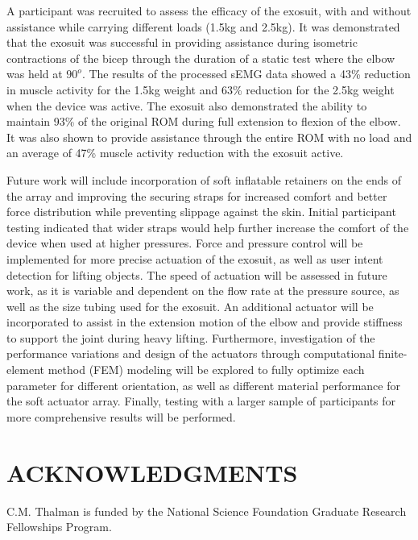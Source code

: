 \documentclass[letterpaper, 10 pt, conference]{ieeeconf}  %
\begin{document}
A participant was recruited to assess the efficacy of the exosuit, with and without assistance while carrying different loads (1.5kg and 2.5kg). It was demonstrated that the exosuit was successful in providing assistance during isometric contractions of the bicep through the duration of a static test where the elbow was held at $90^o$. The results of the processed sEMG data showed a 43\% reduction in muscle activity for the 1.5kg weight and 63\% reduction for the 2.5kg weight when the device was active. The exosuit also demonstrated  the ability to maintain 93\% of the original ROM during full extension to flexion of the elbow.  It was also shown to provide assistance through the entire ROM with no load and an average of 47\% muscle activity reduction with the exosuit active. 

Future work will include incorporation of soft inflatable retainers on the ends of the array and improving the securing straps for increased comfort and better force distribution while preventing slippage against the skin.  Initial participant testing indicated that wider straps would help further increase the comfort of the device when used at higher pressures. Force and pressure control will be implemented for more precise actuation of the exosuit, as well as user intent detection for lifting objects.  The speed of actuation will be assessed in future work, as it is variable and dependent on the flow rate at the pressure source, as well as the size tubing used for the exosuit. An additional actuator will be incorporated to assist in the extension motion of the elbow and provide stiffness to support the joint during heavy lifting. Furthermore, investigation of the performance variations and design of the actuators through computational finite-element method (FEM) modeling will be explored to fully optimize each parameter for different orientation, as well as different material performance for the soft actuator array.  Finally, testing with a larger sample of participants for more comprehensive results will be performed.  



\section*{ACKNOWLEDGMENTS}
C.M. Thalman is funded by the National Science Foundation Graduate Research Fellowships Program.  

\end{document}
